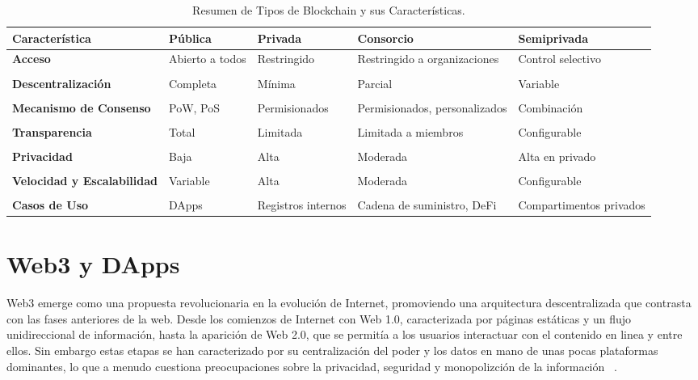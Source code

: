 \begin{table}
\small
\begin{centering}
		\begin{tabular}{@{}p{3.3cm} p{2cm} p{2.5cm} p{2.5cm} p{2.5cm}@{}}
		\toprule
		\textbf{Característica} & \textbf{Pública} & \textbf{Privada} & \textbf{Consorcio} & \textbf{Semiprivada} \\ 
		\midrule
		\textbf{Acceso} & Abierto a todos & Restringido & Restringido a organizaciones & Control selectivo \\\\
		\textbf{Descentralización} & Completa & Mínima & Parcial & Variable \\\\
		\textbf{Mecanismo de Consenso} & PoW, PoS & Permisionados & Permisionados, personalizados & Combinación \\\\
		\textbf{Transparencia} & Total & Limitada & Limitada a miembros & Configurable \\\\
		\textbf{Privacidad} & Baja & Alta & Moderada & Alta en privado \\\\
		\textbf{Velocidad y Escalabilidad} & Variable & Alta & Moderada & Configurable \\\\
		\textbf{Casos de Uso} & DApps & Registros internos & Cadena de suministro, DeFi & Compartimentos privados \\
		\bottomrule
		\end{tabular}
\end{centering}
\caption{Resumen de Tipos de Blockchain y sus Características.}
\label{tabla_blockchain_caracteristicas}	
\end{table}



\section{Web3 y DApps}

Web3 emerge como una propuesta revolucionaria en la evolución de Internet, promoviendo una arquitectura descentralizada que contrasta con las fases anteriores de la web.
Desde los comienzos de Internet con Web 1.0, caracterizada por páginas estáticas y un flujo unidireccional de información, hasta la aparición de Web 2.0, que se permitía a los usuarios interactuar con el contenido en linea y entre ellos. 
Sin embargo estas etapas se han caracterizado por su centralización del poder y los datos en mano de unas pocas plataformas dominantes, lo que a menudo cuestiona preocupaciones sobre la privacidad, seguridad y monopolizción de la información ~\cite{Web3}. 

